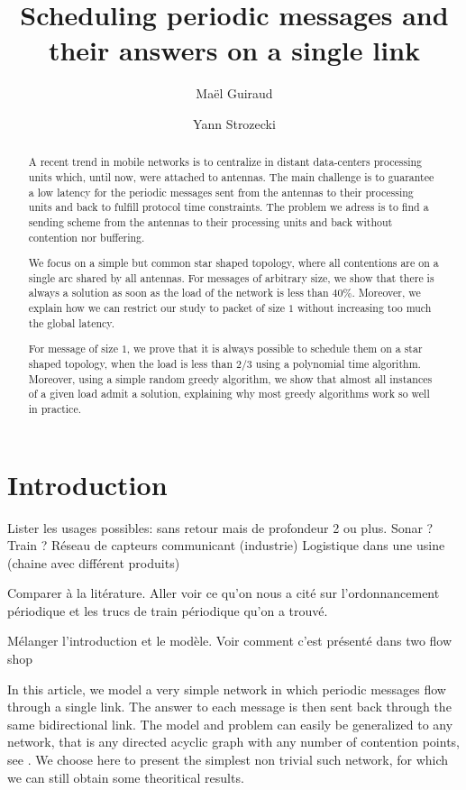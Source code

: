 \documentclass[10pt, conference, letterpaper]{IEEEtran}
\title{Scheduling periodic messages and their answers on a single link}
\author[1,2]{Ma\"el Guiraud}
\author[1]{Yann Strozecki}
\affil[1]{David Laboratory, UVSQ}
\affil[2]{Nokia Bell Labs France}
\begin{document}
\maketitle

\begin{abstract}

A recent trend in mobile networks is to centralize in distant data-centers processing units which, until now, were attached to antennas. The main challenge is to guarantee a low latency for the periodic messages sent from the antennas to their processing units and back  to fulfill protocol time constraints. The problem we adress is to find a sending scheme from the antennas to their processing units and back without contention nor buffering.

We focus on a simple but common star shaped topology, where all contentions are on a single arc shared by all antennas. For messages of arbitrary size, we show that there is always a solution as soon as the load of the network is less than $40\%$. Moreover, we explain how we can restrict our study to packet of size $1$ without increasing too much the global latency. 

For message of size $1$, we prove that it is always possible to schedule them on a star shaped topology, when the load is less than $2/3$ using a polynomial time algorithm.
Moreover, using a simple random greedy algorithm, we show that almost all
instances of a given load admit a solution, explaining why most greedy algorithms work so well in practice.  
\end{abstract}


\section{Introduction}

Lister les usages possibles: 
sans retour mais de profondeur 2 ou plus. Sonar ? Train ?
Réseau de capteurs communicant (industrie)
Logistique dans une usine (chaine avec différent produits)

Comparer à la litérature. Aller voir ce qu'on nous a cité sur l'ordonnancement périodique 
et les trucs de train périodique qu'on a trouvé.



Mélanger l'introduction et le modèle. Voir comment c'est présenté dans two flow shop

In this article, we model a very simple network in which periodic messages flow through a single link. The answer to each message is then sent back through the same bidirectional link. The model and problem can easily be generalized to any network, that is any directed acyclic graph with any number of contention points, see \cite{dominique2018deterministic}. We choose here to present the simplest non trivial such network, for which we can still obtain some theoritical results. 
\end{document}

